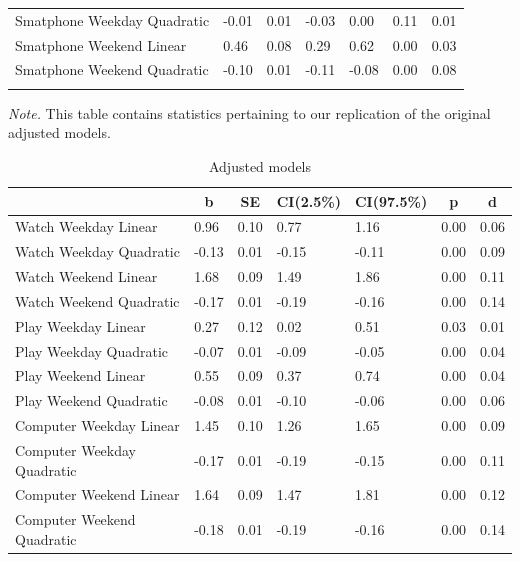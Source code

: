 \documentclass[floatsintext,man]{apa6}
\theoremstyle{definition}
\theoremstyle{definition}
\theoremstyle{definition}
\theoremstyle{remark}
\begin{document}
\begin{table}[tbp]
\begin{center}
\begin{threeparttable}
{\begin{tabular}{lllllll}
Smatphone Weekday Quadratic & -0.01 & 0.01 & -0.03 & 0.00 & 0.11 & 0.01\\
Smatphone Weekend Linear & 0.46 & 0.08 & 0.29 & 0.62 & 0.00 & 0.03\\
Smatphone Weekend Quadratic & -0.10 & 0.01 & -0.11 & -0.08 & 0.00 & 0.08\\
\bottomrule
\addlinespace
\end{tabular}
}
\begin{tablenotes}[para]
\textit{Note.} This table contains statistics pertaining to our replication of the original adjusted models.
\end{tablenotes}
\end{threeparttable}
\end{center}
\end{table}

\begin{table}[tbp]
\begin{center}
\begin{threeparttable}
\caption{\label{tab:unnamed-chunk-1}Adjusted models}
\begin{tabular}{lllllll}
\toprule
 & \multicolumn{1}{c}{b} & \multicolumn{1}{c}{SE} & \multicolumn{1}{c}{CI(2.5\%)} & \multicolumn{1}{c}{CI(97.5\%)} & \multicolumn{1}{c}{p} & \multicolumn{1}{c}{d}\\
\midrule
Watch Weekday Linear & 0.96 & 0.10 & 0.77 & 1.16 & 0.00 & 0.06\\
Watch Weekday Quadratic & -0.13 & 0.01 & -0.15 & -0.11 & 0.00 & 0.09\\
Watch Weekend Linear & 1.68 & 0.09 & 1.49 & 1.86 & 0.00 & 0.11\\
Watch Weekend Quadratic & -0.17 & 0.01 & -0.19 & -0.16 & 0.00 & 0.14\\
Play Weekday Linear & 0.27 & 0.12 & 0.02 & 0.51 & 0.03 & 0.01\\
Play Weekday Quadratic & -0.07 & 0.01 & -0.09 & -0.05 & 0.00 & 0.04\\
Play Weekend Linear & 0.55 & 0.09 & 0.37 & 0.74 & 0.00 & 0.04\\
Play Weekend Quadratic & -0.08 & 0.01 & -0.10 & -0.06 & 0.00 & 0.06\\
Computer Weekday Linear & 1.45 & 0.10 & 1.26 & 1.65 & 0.00 & 0.09\\
Computer Weekday Quadratic & -0.17 & 0.01 & -0.19 & -0.15 & 0.00 & 0.11\\
Computer Weekend Linear & 1.64 & 0.09 & 1.47 & 1.81 & 0.00 & 0.12\\
Computer Weekend Quadratic & -0.18 & 0.01 & -0.19 & -0.16 & 0.00 & 0.14\\

\end{tabular}
\end{threeparttable}
\end{center}
\end{table}
\end{document}
